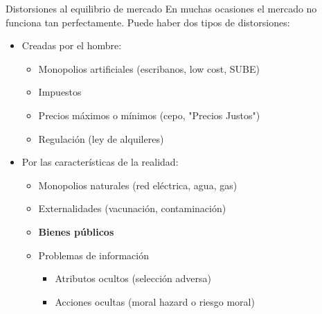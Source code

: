 \documentclass{beamer}
\begin{document}
\begin{frame}{Distorsiones al equilibrio de mercado}
    En muchas ocasiones el mercado no funciona tan perfectamente. Puede haber dos tipos de distorsiones: \vspace{1mm}
    \begin{itemize}
        \item Creadas por el hombre:
        \begin{itemize}
            \item Monopolios artificiales (escribanos, low cost, SUBE)
             \vspace{1mm}
             \item Impuestos
             \vspace{1mm}
            \item Precios máximos o mínimos (cepo, "Precios Justos")
             \vspace{1mm}
            \item Regulación (ley de alquileres)
        \end{itemize}
        \vspace{1mm}
        \item Por las características de la realidad:
        \begin{itemize}
            \item Monopolios naturales (red eléctrica, agua, gas)   
             \vspace{1mm}
            \item Externalidades (vacunación, contaminación)
             \vspace{1mm}
            \item \textbf{Bienes públicos}
            \vspace{1mm}
            \item Problemas de información
            \begin{itemize}
                \item Atributos ocultos (selección adversa)
                 \vspace{1mm}
                \item Acciones ocultas (moral hazard o riesgo moral)
            \end{itemize}        
        \end{itemize}
    \end{itemize}
\end{frame}
\end{document}

